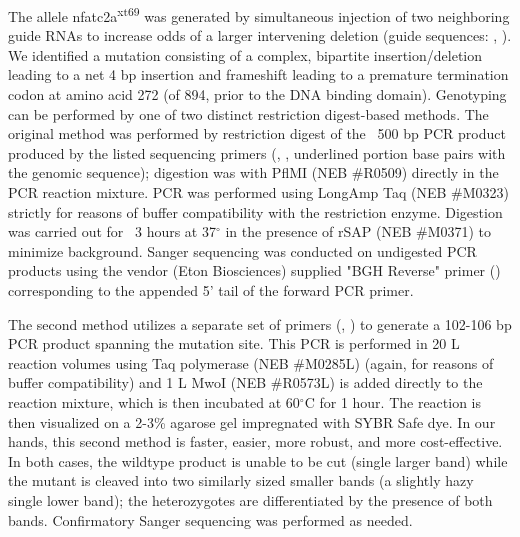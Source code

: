 The allele nfatc2a\textsuperscript{xt69} was generated by simultaneous injection of two neighboring guide RNAs to increase odds of a larger intervening deletion (guide sequences: , ). We identified a mutation consisting of a complex, bipartite insertion/deletion leading to a net 4 bp insertion and frameshift leading to a premature termination codon at amino acid 272 (of 894, prior to the DNA binding domain). Genotyping can be performed by one of two distinct restriction digest-based methods. The original method was performed by restriction digest of the ~500 bp PCR product produced by the listed sequencing primers (, , underlined portion base pairs with the genomic sequence); digestion was with PflMI (NEB \#R0509) directly in the PCR reaction mixture. PCR was performed using LongAmp Taq (NEB \#M0323) strictly for reasons of buffer compatibility with the restriction enzyme. Digestion was carried out for ~3 hours at 37$^{\circ}$ in the presence of rSAP (NEB \#M0371) to minimize background. Sanger sequencing was conducted on undigested PCR products using the vendor (Eton Biosciences) supplied "BGH Reverse" primer () corresponding to the appended 5' tail of the forward PCR primer. 

The second method utilizes a separate set of primers (, ) to generate a 102-106 bp PCR product spanning the mutation site. This PCR is performed in 20 \textmu L reaction volumes using Taq polymerase (NEB \#M0285L) (again, for reasons of buffer compatibility) and 1 \textmu L MwoI (NEB \#R0573L) is added directly to the reaction mixture, which is then incubated at 60$^{\circ}$C for 1 hour. The reaction is then visualized on a 2-3\% agarose gel impregnated with SYBR Safe dye. In our hands, this second method is faster, easier, more robust, and more cost-effective. In both cases, the wildtype product is unable to be cut (single larger band) while the mutant is cleaved into two similarly sized smaller bands (a slightly hazy single lower band); the heterozygotes are differentiated by the presence of both bands. Confirmatory Sanger sequencing was performed as needed.

